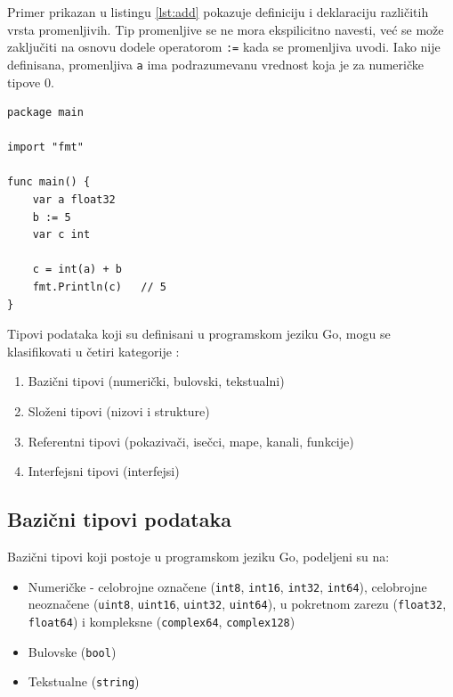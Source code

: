 \documentclass[12pt,oneside]{memoir}
\begin{document}
Primer prikazan u listingu \ref{lst:add} pokazuje definiciju i deklaraciju različitih vrsta promenljivih. Tip promenljive se ne mora ekspilicitno navesti, već se može zaključiti na osnovu dodele operatorom \texttt{:=} kada se promenljiva uvodi. Iako nije definisana, promenljiva \texttt{a} ima podrazumevanu vrednost koja je za numeričke tipove 0.

\begin{center}
\begin{lstlisting}[caption=Primer programa koji ilustruje rad sa promenljivama, label={lst:add},  backgroundcolor=\color{background}]
package main

import "fmt"

func main() {
	var a float32
	b := 5
	var c int

	c = int(a) + b
	fmt.Println(c)	 // 5
}
\end{lstlisting}
\end{center}

\newpage

Tipovi podataka koji su definisani u programskom jeziku Go, mogu se klasifikovati u četiri kategorije \cite{bookGoProg}: 
\begin{enumerate}
\item Bazični tipovi  (numerički, bulovski, tekstualni)
\item Složeni tipovi (nizovi i strukture)
\item Referentni tipovi (pokazivači, isečci, mape, kanali, funkcije)
\item Interfejsni tipovi (interfejsi)
\end{enumerate}


\subsection{Bazični tipovi podataka}

Bazični tipovi koji postoje u programskom jeziku Go, podeljeni su na:
\begin{itemize}

\item Numeričke -  celobrojne označene (\texttt{int8}, \texttt{int16}, \texttt{int32}, \texttt{int64}),
 celobrojne neoznačene  (\texttt{uint8}, \texttt{uint16}, \texttt{uint32}, \texttt{uint64}), u pokretnom zarezu (\texttt{float32}, \texttt{float64}) i kompleksne (\texttt{complex64}, \texttt{complex128})

\item Bulovske  (\texttt{bool})

\item Tekstualne (\texttt{string})

\end{itemize}
\end{document}
